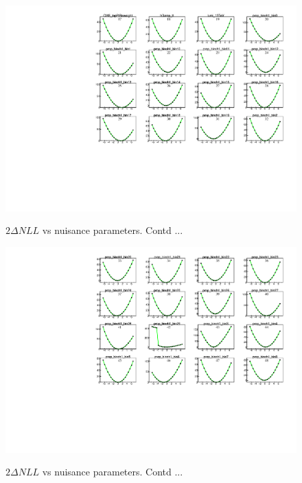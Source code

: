 \begin{figure}
    \centering  
    {\includegraphics[width=1.0\linewidth]{Image/MLFit/ScanNuis/scanNuis2.pdf}}
    \caption{  $2\Delta NLL$ vs nuisance parameters. Contd ...}
    \label{fig:nuisScan2}
\end{figure}
\begin{figure}
    \centering  
    {\includegraphics[width=1.0\linewidth]{Image/MLFit/ScanNuis/scanNuis3.pdf}}
    \caption{  $2\Delta NLL$ vs nuisance parameters. Contd ...}
    \label{fig:nuisScan3}
\end{figure}


